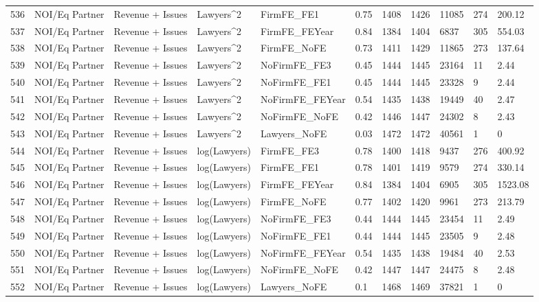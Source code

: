 \documentclass{article}
\begin{document}
\begin{table}[H]
\begin{tabular}{rllllllllll}
  536 & NOI/Eq Partner & Revenue + Issues & Lawyers^2 & FirmFE\_FE1 & 0.75 & 1408 & 1426 & 11085 & 274 & 200.12 \\ 
  537 & NOI/Eq Partner & Revenue + Issues & Lawyers^2 & FirmFE\_FEYear & 0.84 & 1384 & 1404 & 6837 & 305 & 554.03 \\ 
  538 & NOI/Eq Partner & Revenue + Issues & Lawyers^2 & FirmFE\_NoFE & 0.73 & 1411 & 1429 & 11865 & 273 & 137.64 \\ 
  539 & NOI/Eq Partner & Revenue + Issues & Lawyers^2 & NoFirmFE\_FE3 & 0.45 & 1444 & 1445 & 23164 & 11 & 2.44 \\ 
  540 & NOI/Eq Partner & Revenue + Issues & Lawyers^2 & NoFirmFE\_FE1 & 0.45 & 1444 & 1445 & 23328 & 9 & 2.44 \\ 
  541 & NOI/Eq Partner & Revenue + Issues & Lawyers^2 & NoFirmFE\_FEYear & 0.54 & 1435 & 1438 & 19449 & 40 & 2.47 \\ 
  542 & NOI/Eq Partner & Revenue + Issues & Lawyers^2 & NoFirmFE\_NoFE & 0.42 & 1446 & 1447 & 24302 & 8 & 2.43 \\ 
  543 & NOI/Eq Partner & Revenue + Issues & Lawyers^2 & Lawyers\_NoFE & 0.03 & 1472 & 1472 & 40561 & 1 & 0 \\ 
  544 & NOI/Eq Partner & Revenue + Issues & log(Lawyers) & FirmFE\_FE3 & 0.78 & 1400 & 1418 & 9437 & 276 & 400.92 \\ 
  545 & NOI/Eq Partner & Revenue + Issues & log(Lawyers) & FirmFE\_FE1 & 0.78 & 1401 & 1419 & 9579 & 274 & 330.14 \\ 
  546 & NOI/Eq Partner & Revenue + Issues & log(Lawyers) & FirmFE\_FEYear & 0.84 & 1384 & 1404 & 6905 & 305 & 1523.08 \\ 
  547 & NOI/Eq Partner & Revenue + Issues & log(Lawyers) & FirmFE\_NoFE & 0.77 & 1402 & 1420 & 9961 & 273 & 213.79 \\ 
  548 & NOI/Eq Partner & Revenue + Issues & log(Lawyers) & NoFirmFE\_FE3 & 0.44 & 1444 & 1445 & 23454 & 11 & 2.49 \\ 
  549 & NOI/Eq Partner & Revenue + Issues & log(Lawyers) & NoFirmFE\_FE1 & 0.44 & 1444 & 1445 & 23505 & 9 & 2.48 \\ 
  550 & NOI/Eq Partner & Revenue + Issues & log(Lawyers) & NoFirmFE\_FEYear & 0.54 & 1435 & 1438 & 19484 & 40 & 2.53 \\ 
  551 & NOI/Eq Partner & Revenue + Issues & log(Lawyers) & NoFirmFE\_NoFE & 0.42 & 1447 & 1447 & 24475 & 8 & 2.48 \\ 
  552 & NOI/Eq Partner & Revenue + Issues & log(Lawyers) & Lawyers\_NoFE & 0.1 & 1468 & 1469 & 37821 & 1 & 0 \\ 

\end{tabular}
\end{table}
\end{document}
